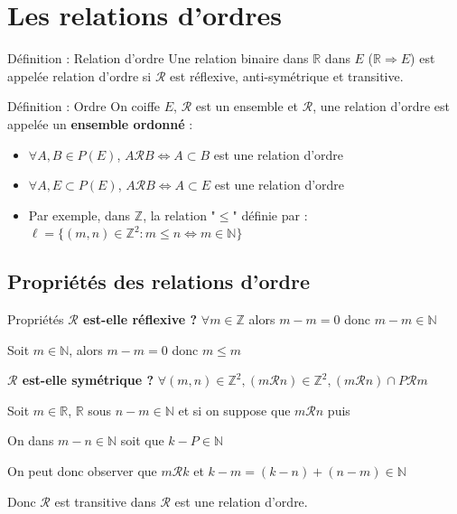 \documentclass[a4paper,11pt]{article}
\begin{document}
\newpage
\section{Les relations d'ordres}

\begin{defbox}{Définition : Relation d'ordre}
Une relation binaire dans $\mathbb{R}$ dans $E$ ($\mathbb{R} \Rightarrow E$) est appelée relation d'ordre si $\mathcal{R}$ est réflexive, anti-symétrique et transitive.
\end{defbox}

\begin{defbox}{Définition : Ordre}
On coiffe $E$, $\mathcal{R}$ est un ensemble et $\mathcal{R}$, une relation d'ordre est appelée un \textbf{ensemble ordonné} :

\begin{itemize}
    \item $\forall A, B \in P(E)$, $A \mathcal{R} B \Leftrightarrow A \subset B$ est une relation d'ordre
    \item $\forall A, E \subset P(E)$, $A \mathcal{R} B \Leftrightarrow A \subset E$ est une relation d'ordre
    \item Par exemple, dans $\mathbb{Z}$, la relation "$\leq$" définie par :
    $\ell = \{(m, n) \in \mathbb{Z}^2 : m \leq n \Leftrightarrow m \in \mathbb{N}\}$
\end{itemize}
\end{defbox}

\subsection{Propriétés des relations d'ordre}

\begin{propbox}{Propriétés}
\textbf{$\mathcal{R}$ est-elle réflexive ?} $\forall m \in \mathbb{Z}$ alors $m - m = 0$ donc $m - m \in \mathbb{N}$

Soit $m \in \mathbb{N}$, alors $m - m = 0$ donc $m \leq m$

\textbf{$\mathcal{R}$ est-elle symétrique ?} $\forall (m, n) \in \mathbb{Z}^2, (m \mathcal{R} n) \in \mathbb{Z}^2, (m \mathcal{R} n) \cap P \mathcal{R} m$

Soit $m \in \mathbb{R}$, $\mathbb{R}$ sous $n - m \in \mathbb{N}$ et si on suppose que $m \mathcal{R} n$ puis

On dans $m - n \in \mathbb{N}$ soit que $k - P \in \mathbb{N}$

On peut donc observer que $m \mathcal{R} k$ et $k - m = (k - n) + (n - m) \in \mathbb{N}$

Donc $\mathcal{R}$ est transitive dans $\mathcal{R}$ est une relation d'ordre.
\end{propbox}
\end{document}
